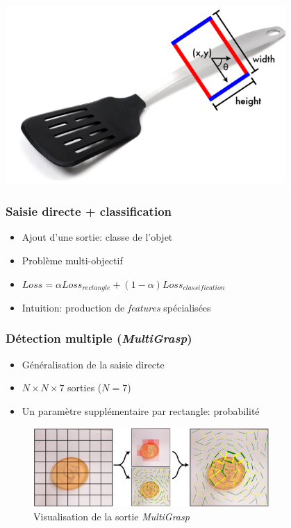 \documentclass{beamer}
\begin{document}
\begin{frame}
    \includegraphics[width=0.8\textwidth]{img/grasp_rectangle.png}
\end{frame}

\begin{frame}
  \frametitle{Saisie directe + classification}
  \begin{itemize}
  \item Ajout d'une sortie: classe de l'objet
  \item Problème multi-objectif
  \item $Loss = \alpha Loss_{rectangle} + (1 - \alpha) Loss_{classification}$
  \item Intuition: production de \emph{features} spécialisées
  \end{itemize}
\end{frame}

\begin{frame}
  \frametitle{Détection multiple (\emph{MultiGrasp})}
  \begin{itemize}
  \item Généralisation de la saisie directe
  \item $N \times N \times 7$ sorties ($N = 7$)
  \item Un paramètre supplémentaire par rectangle: probabilité
  \end{itemize}
  \begin{figure}
    \centering
    \includegraphics[width=0.8\textwidth]{img/multigrasp.png}
    \caption{Visualisation de la sortie \emph{MultiGrasp}}
    \label{fig:multigrasp}
  \end{figure}
\end{frame}
\end{document}
